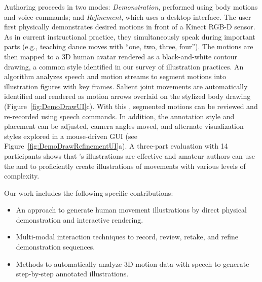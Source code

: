 Authoring proceeds in two modes: {\em Demonstration}, performed using body motions and voice commands; and {\em Refinement}, which uses a desktop interface.
%
The user first physically demonstrates desired motions in front of a Kinect RGB-D sensor. As in current instructional practice, they simultaneously speak during important parts (e.g., teaching dance moves with ``one, two, three, four'').
The motions are then mapped to a 3D human avatar rendered as a black-and-white contour drawing, a common style identified in our survey of illustration practices.
%
An algorithm analyzes speech and motion streams to segment motions into illustration figures with key frames. Salient joint movements are automatically identified and rendered as motion arrows overlaid on the stylized body drawing (Figure~\ref{fig:DemoDrawUI}c).
%
With this {\em \phaseI{}}, segmented motions can be reviewed and re-recorded using speech commands.
In addition, the annotation style and placement can be adjusted, camera angles moved, and alternate visualization styles explored in a mouse-driven GUI \emph{\phaseII{}} (see Figure~\ref{fig:DemoDrawRefinementUI}a).
%
A three-part evaluation with 14 participants shows that \systemname{}'s illustrations are effective and amateur authors can use the \phaseI{} and \phaseII{} to proficiently create illustrations of movements with various levels of complexity.

Our work includes the following specific contributions:

\begin{itemize}
  \item An approach to generate human movement illustrations by direct physical demonstration and interactive rendering.
  \item Multi-modal interaction techniques to record, review, retake, and refine demonstration sequences.
  \item Methods to automatically analyze 3D motion data with speech to generate step-by-step annotated illustrations.
\end{itemize}
